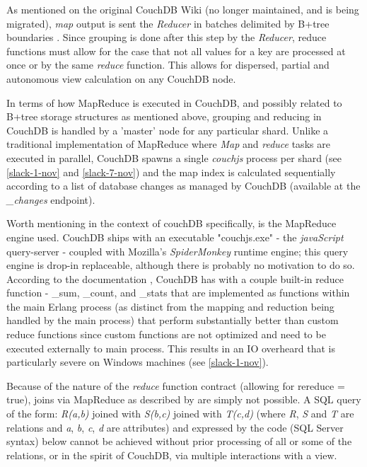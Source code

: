 As mentioned on the original CouchDB Wiki (no longer maintained, and is being migrated), \textit{map} output is sent the \textit{Reducer} in batches delimited by B+tree boundaries \cite{couchwiki}. Since grouping is done after this step by the \textit{Reducer}, reduce functions must allow for the case that not all values for a key are processed at once or by the same \textit{reduce} function. This allows for dispersed, partial and autonomous view calculation on any CouchDB node.

In terms of how MapReduce is executed in CouchDB, and possibly related to B+tree storage structures as mentioned above, grouping and reducing in CouchDB is handled by a 'master' node for any particular shard. Unlike a traditional implementation of MapReduce where \textit{Map} and \textit{reduce} tasks are executed in parallel, CouchDB spawns a single \textit{couchjs} process per shard (see \ref{slack-1-nov} and \ref{slack-7-nov}) and the map index is calculated sequentially according to a list of database changes as managed by CouchDB (available at the \textit{\_changes} endpoint).

Worth mentioning in the context of couchDB specifically, is the MapReduce engine used. CouchDB ships with an executable "couchjs.exe" - the \textit{javaScript} query-server - coupled with Mozilla's \textit{SpiderMonkey} runtime engine; this query engine is drop-in replaceable, although there is probably no motivation to do so. According to the documentation \cite{builtincouchreduce}, CouchDB has with a couple built-in reduce function - \_sum, \_count, and \_stats that are implemented as functions within the main Erlang process (as distinct from the mapping and reduction being handled by the main process) that perform substantially better than custom reduce functions since custom functions are not optimized and need to be executed externally to main process. This results in an I\/O overheard that is particularly severe on Windows machines (see \ref{slack-1-nov}).

Because of the nature of the \textit{reduce} function contract (allowing for rereduce = true), joins via MapReduce as described by \cite{chandar2010} are simply not possible. A SQL query of the form: \textit{R(a,b)} joined with \textit{S(b,c)} joined with \textit{T(c,d)} (where \textit{R}, \textit{S} and \textit{T} are relations and \textit{a}, \textit{b}, \textit{c}, \textit{d} are attributes) and expressed by the code (SQL Server syntax) below cannot be achieved without prior processing of all or some of the relations, or in the spirit of CouchDB, via multiple interactions with a view.

